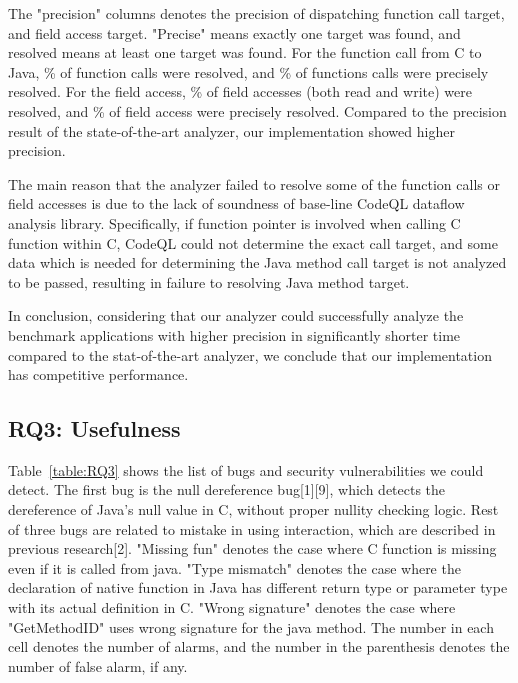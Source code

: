 The "precision" columns denotes the precision of dispatching function call
target, and field access target.  "Precise" means exactly one target was found,
and resolved means at least one target was found. For the function call from C to Java,
\% of function calls were resolved, and \% of functions calls
were precisely resolved. For the field access, \% of field accesses (both
read and write) were resolved, and \% of field access were precisely resolved.
Compared to the precision result of the state-of-the-art analyzer, our implementation
showed higher precision.

The main reason that the analyzer failed to resolve some of the function calls
or field accesses is due to the lack of soundness of base-line CodeQL dataflow
analysis library.  Specifically, if function pointer is involved when calling C
function within C, CodeQL could not determine the exact call target, and some
data which is needed for determining the Java method call target is not
analyzed to be passed, resulting in failure to resolving Java method target.

In conclusion, considering that our analyzer could successfully analyze the
benchmark applications with higher precision in significantly shorter time
compared to the stat-of-the-art analyzer, we conclude that our implementation
has competitive performance.

\subsection{RQ3: Usefulness}

Table~\ref{table:RQ3} shows the list of bugs and security vulnerabilities we could detect.
The first bug is the null dereference bug[1][9], which detects the dereference of
Java's null value in C, without proper nullity checking logic. Rest of three
bugs are related to mistake in using interaction, which are described in
previous research[2]. "Missing fun" denotes the case where C function is
missing even if it is called from java. "Type mismatch" denotes the case where
the declaration of native function in Java has different return type or
parameter type with its actual definition in C.  "Wrong signature" denotes the
case where "GetMethodID" uses wrong signature for the java method. The
number in each cell denotes the number of alarms, and the number in the
parenthesis denotes the number of false alarm, if any.

